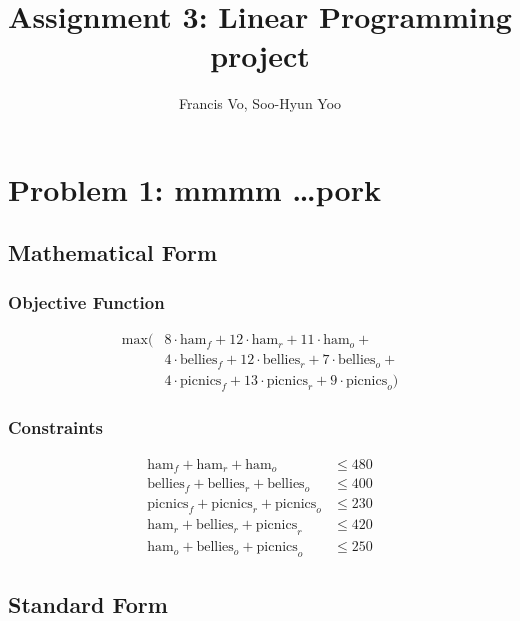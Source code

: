 \documentclass[letterpaper,10pt]{article}
\title{Assignment 3: Linear Programming project}
\author{Francis Vo, Soo-Hyun Yoo}
\begin{document}
	\maketitle

	\section{Problem 1: mmmm \dots pork}

	\subsection{Mathematical Form}
		\subsubsection{Objective Function}
			\begin{align*}
				\text{max} ( & 8\cdot\text{ham}_f + 12\cdot\text{ham}_r + 11\cdot\text{ham}_o + \\
							 & 4\cdot\text{bellies}_f + 12\cdot\text{bellies}_r + 7\cdot\text{bellies}_o + \\
							 & 4\cdot\text{picnics}_f + 13\cdot\text{picnics}_r + 9\cdot\text{picnics}_o )
			\end{align*}

		\subsubsection{Constraints}
			\begin{align*}
				\text{ham}_f + \text{ham}_r + \text{ham}_o             &\le 480 \\
				\text{bellies}_f + \text{bellies}_r + \text{bellies}_o &\le 400 \\
				\text{picnics}_f + \text{picnics}_r + \text{picnics}_o &\le 230 \\
				\text{ham}_r + \text{bellies}_r + \text{picnics}_r     &\le 420 \\
				\text{ham}_o + \text{bellies}_o + \text{picnics}_o     &\le 250
			\end{align*}


	\subsection{Standard Form}
\end{document}
